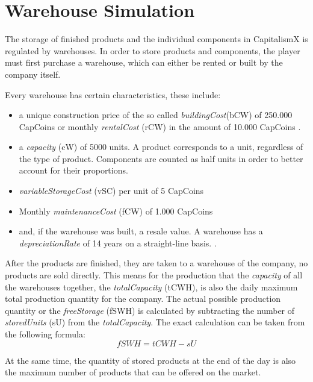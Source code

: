 \section{Warehouse Simulation} \label{warehouse_simulation}

The storage of finished products and the individual components in CapitalismX is regulated by warehouses. In order to store products and components, the player must first purchase a warehouse, which can either be rented or built by the company itself.

Every warehouse has certain characteristics, these include:
\begin{itemize}
    \item a unique construction price of the so called \textit{buildingCost}(\gls{bCW}) of 250.000 CapCoins  \cite{carrot_media_v.o.s._hallenbau_2018} or monthly \textit{rentalCost} (\gls{rCW}) in the amount of 10.000 CapCoins \cite{jll_mietpreisspanne_nodate}.
    \item a \textit{capacity} (\gls{cW}) of 5000 units. A product corresponds to a unit, regardless of the type of product. Components are counted as half units in order to better account for their proportions. 
    \item \textit{variableStorageCost} (\gls{vSC}) per unit of 5 CapCoins
    \item Monthly \textit{maintenanceCost} (\gls{fCW}) of 1.000 CapCoins
    \item and, if the warehouse was built, a resale value. A warehouse has a \textit{depreciationRate} of 14 years on a straight-line basis.  \cite{noauthor_amtliche_nodate}.
\end{itemize}

After the products are finished, they are taken to a warehouse of the company, no products are sold directly. This means for the production that the \textit{capacity} of all the warehouses together, the \textit{totalCapacity} (\gls{tCWH}), is also the daily maximum total production quantity for the company. The actual possible production quantity or the \textit{freeStorage} (\gls{fSWH}) is calculated by subtracting the number of \textit{storedUnits} (\gls{sU}) from the \textit{totalCapacity}. The exact calculation can be taken from the following formula: 
\begin{equation}
    fSWH = tCWH - sU
\end{equation}

At the same time, the quantity of stored products at the end of the day is also the maximum number of products that can be offered on the market. 

